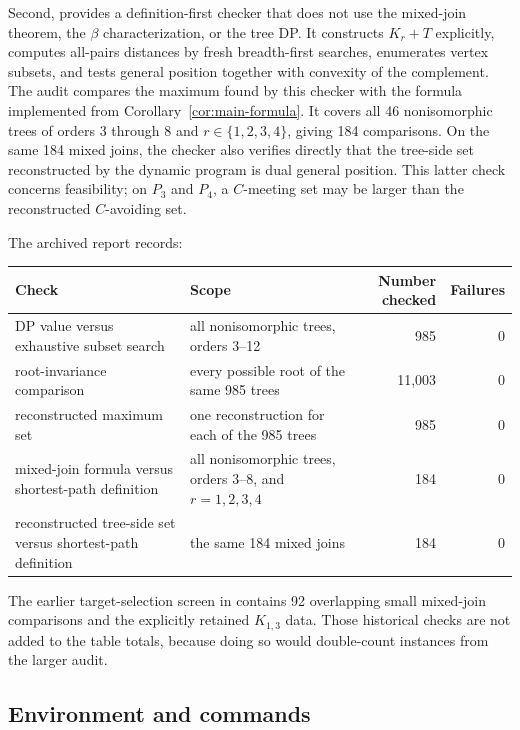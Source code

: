 \documentclass[11pt,a4paper]{article}
\providecommand{\Needspace}[1]{}
\numberwithin{equation}{section}
\begin{document}
Second,  provides a
definition-first checker that does not use the mixed-join theorem, the
\(\beta\) characterization, or the tree DP. It constructs \(K_r+T\)
explicitly, computes all-pairs distances by fresh breadth-first
searches, enumerates vertex subsets, and tests general position together
with convexity of the complement. The audit compares the maximum found
by this checker with the formula implemented from Corollary~\ref{cor:main-formula}. It
covers all 46 nonisomorphic trees of orders 3 through 8 and
\(r\in\{1,2,3,4\}\), giving 184 comparisons.
On the same 184 mixed joins, the checker also verifies directly that the
tree-side set reconstructed by the dynamic program is dual general position.
This latter check concerns feasibility; on \(P_3\) and \(P_4\), a
\(C\)-meeting set may be larger than the reconstructed \(C\)-avoiding set.

\Needspace{8\baselineskip}
The archived report 
records:

\begin{longtable}[]{@{}L{0.25\textwidth}L{0.40\textwidth}rr@{}}
\toprule
Check & Scope & Number checked & Failures \\
\midrule
\endhead
DP value versus exhaustive subset search & all nonisomorphic trees,
orders 3--12 & 985 & 0 \\
root-invariance comparison & every possible root of the same 985 trees &
11,003 & 0 \\
reconstructed maximum set & one reconstruction for each of the 985 trees
& 985 & 0 \\
mixed-join formula versus shortest-path definition & all nonisomorphic
trees, orders 3--8, and \(r=1,2,3,4\) & 184 & 0 \\
reconstructed tree-side set versus shortest-path definition & the same
184 mixed joins & 184 & 0 \\
\bottomrule
\end{longtable}

The earlier target-selection screen in
 contains 92
overlapping small mixed-join comparisons and the explicitly retained
\(K_{1,3}\) data. Those historical checks are not added to the table
totals, because doing so would double-count instances from the larger
audit.

\subsection{Environment and commands}\label{sec:environment}
\end{document}
